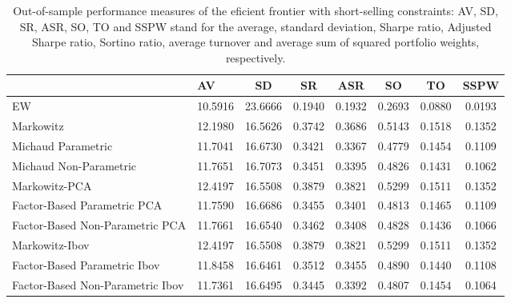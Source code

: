 \begin{table}

\caption{\label{tab:empirical_ef_2}Out-of-sample performance measures of the eficient frontier with short-selling constraints: AV, SD, SR, ASR, SO, TO and SSPW stand for the average, standard deviation, Sharpe ratio, Adjusted Sharpe ratio, Sortino ratio, average turnover and average sum of squared portfolio weights, respectively.}
\centering
\begin{tabular}[t]{l|l|c|c|c|c|c|c}
\hline
  & AV & SD & SR & ASR & SO & TO & SSPW\\
\hline
EW & 10.5916 & 23.6666 & 0.1940 & 0.1932 & 0.2693 & 0.0880 & 0.0193\\
\hline
Markowitz & 12.1980 & 16.5626 & 0.3742 & 0.3686 & 0.5143 & 0.1518 & 0.1352\\
\hline
Michaud Parametric & 11.7041 & 16.6730 & 0.3421 & 0.3367 & 0.4779 & 0.1454 & 0.1109\\
\hline
Michaud Non-Parametric & 11.7651 & 16.7073 & 0.3451 & 0.3395 & 0.4826 & 0.1431 & 0.1062\\
\hline
Markowitz-PCA & 12.4197 & 16.5508 & 0.3879 & 0.3821 & 0.5299 & 0.1511 & 0.1352\\
\hline
Factor-Based Parametric PCA & 11.7590 & 16.6686 & 0.3455 & 0.3401 & 0.4813 & 0.1465 & 0.1109\\
\hline
Factor-Based Non-Parametric PCA & 11.7661 & 16.6540 & 0.3462 & 0.3408 & 0.4828 & 0.1436 & 0.1066\\
\hline
Markowitz-Ibov & 12.4197 & 16.5508 & 0.3879 & 0.3821 & 0.5299 & 0.1511 & 0.1352\\
\hline
Factor-Based Parametric Ibov & 11.8458 & 16.6461 & 0.3512 & 0.3455 & 0.4890 & 0.1440 & 0.1108\\
\hline
Factor-Based Non-Parametric Ibov & 11.7361 & 16.6495 & 0.3445 & 0.3392 & 0.4807 & 0.1454 & 0.1064\\
\hline
\end{tabular}
\end{table}
